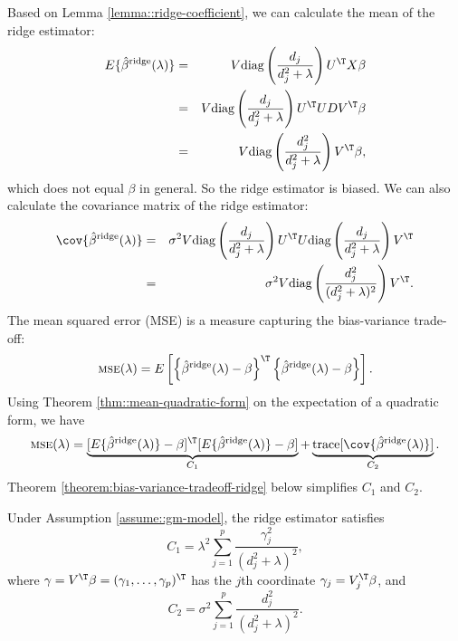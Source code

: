  


Based on Lemma \ref{lemma::ridge-coefficient}, we can calculate the mean of the ridge estimator:
\begin{eqnarray*}
E\{  \hat{\beta}^{\text{ridge}}(\lambda)\} &=& V\text{diag}\left(  \frac{d_j}{d_j^2 + \lambda }  \right)  U^{\T} X\beta \\
&=&  V\text{diag}\left(  \frac{d_j}{d_j^2 + \lambda }  \right)  U^{\T} UDV^{\T}\beta \\
&=& V\text{diag}\left(  \frac{d_j^2}{d_j^2 + \lambda }  \right) V^{\T}\beta, 
\end{eqnarray*}
which does not equal $\beta$ in general. So the ridge estimator is biased. We can also calculate the covariance  matrix of the ridge estimator:
\begin{eqnarray*}
\cov\{  \hat{\beta}^{\text{ridge}}(\lambda)\} &=& \sigma^2 V\text{diag}\left(  \frac{d_j}{d_j^2 + \lambda }  \right)  U^{\T}  
U\text{diag}\left(  \frac{d_j}{d_j^2 + \lambda }  \right) V^{\T}  \\
&=&  \sigma^2 V\text{diag}\left(  \frac{d_j^2}{(d_j^2 + \lambda)^2 }  \right)   V^{\T}  . 
\end{eqnarray*}
The mean squared error (MSE)
is a measure capturing the bias-variance trade-off:
\[
\textsc{mse}(\lambda)=E\left[\left\{ \hat{\beta}^{\text{ridge}}(\lambda)-\beta\right\} ^{\T}\left\{ \hat{\beta}^{\text{ridge}}(\lambda)-\beta\right\} \right].
\]
Using Theorem \ref{thm::mean-quadratic-form} on the expectation of a quadratic form, we have
\[
\textsc{mse}(\lambda)=\underbrace{    [ E\{  \hat{\beta}^{\text{ridge}}(\lambda)\}  - \beta  ]^{\T} [ E\{  \hat{\beta}^{\text{ridge}}(\lambda)\} - \beta  ]   }_{C_{1}}
+\underbrace{\text{trace}[ \cov\{  \hat{\beta}^{\text{ridge}}(\lambda)\} ]  }_{C_{2}}.
\]
Theorem \ref{theorem:bias-variance-tradeoff-ridge} below simplifies $C_{1}$ and $C_{2}.$ 

 

\begin{theorem}
\label{theorem:bias-variance-tradeoff-ridge} Under  Assumption \ref{assume::gm-model}, the ridge estimator satisfies   
\begin{equation}
C_{1}=\lambda^{2}\sum_{j=1}^{p}\frac{\gamma_{j}^{2}}{( d_j^2 +\lambda)^{2}},\label{eq:term1-ridge-mse}
\end{equation}
where $\gamma=V^{\T}\beta=(\gamma_{1},\ldots,\gamma_{p})^{\T}$ has the $j$th coordinate $\gamma_j = V_j^{\T} \beta$,
and 
\begin{equation}
C_{2}=\sigma^{2}\sum_{j=1}^{p}\frac{ d_j^2 }{( d_j^2 +\lambda)^{2}}.\label{eq:term2-ridge-mse}
\end{equation}
\end{theorem}



